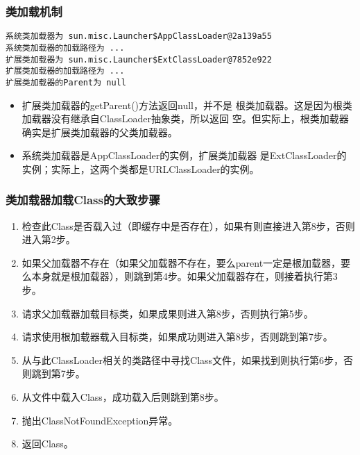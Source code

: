 \begin{frame}[fragile] %
\frametitle{类加载机制}


{\footnotesize
\begin{verbatim}
系统类加载器为 sun.misc.Launcher$AppClassLoader@2a139a55
系统类加载器的加载路径为 ...
扩展类加载器为 sun.misc.Launcher$ExtClassLoader@7852e922
扩展类加载器的加载路径为 ...
扩展类加载器的Parent为 null
\end{verbatim}}

  
\begin{itemize}
\item {\Red\kai 扩展类加载器的getParent()方法返回null，并不是
    根类加载器。这是因为根类加载器没有继承自ClassLoader抽象类，所以返回
    空。但实际上，根类加载器确实是扩展类加载器的父类加载器。}
\item 系统类加载器是AppClassLoader的实例，扩展类加载器
  是ExtClassLoader的实例；实际上，这两个类都是URLClassLoader的实例。
\end{itemize}
\end{frame}

\begin{frame}[fragile] %
\frametitle{类加载器加载Class的大致步骤}
\begin{enumerate}\kai
\item 检查此Class是否载入过（即缓存中是否存在），如果有则直接进入第8步，否则进入第2步。
\item 如果父加载器不存在（如果父加载器不存在，要么parent一定是根加载器，要么本身就是根加载器），则跳到第4步。如果父加载器存在，则接着执行第3步。
\item 请求父加载器加载目标类，如果成果则进入第8步，否则执行第5步。
\item 请求使用根加载器载入目标类，如果成功则进入第8步，否则跳到第7步。
\item 从与此ClassLoader相关的类路径中寻找Class文件，如果找到则执行第6步，否则跳到第7步。
\item 从文件中载入Class，成功载入后则跳到第8步。
\item 抛出ClassNotFoundException异常。
\item 返回Class。
\end{enumerate}
\end{frame}

